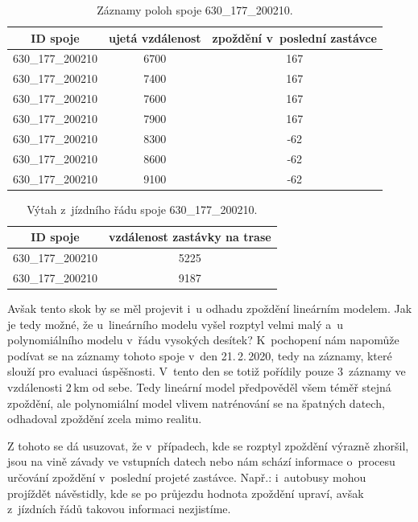 \begin{center}
   \begin{table}[ht]
\centering
\begin{tabular}{|c|c|c|}
\hline
ID spoje & ujetá vzdálenost & zpoždění v~poslední zastávce \\ \hline \hline
630\_177\_200210 & 6700 & 167 \\ \hline
630\_177\_200210 & 7400 & 167 \\ \hline
630\_177\_200210 & 7600 & 167 \\ \hline
630\_177\_200210 & 7900 & 167 \\ \hline
630\_177\_200210 & 8300 & -62 \\ \hline
630\_177\_200210 & 8600 & -62 \\ \hline
630\_177\_200210 & 9100 & -62 \\ \hline
\end{tabular}
\label{table:825_samples}
\caption{Záznamy poloh spoje 630\_177\_200210.}
\end{table}
\end{center}

\begin{center}
   \begin{table}[ht]
\centering
\begin{tabular}{|c|c|}
\hline
ID spoje & vzdálenost zastávky na trase \\ \hline \hline
630\_177\_200210 & 5225 \\ \hline
630\_177\_200210 & 9187 \\ \hline
\end{tabular}
\label{tab:825_ride}
\caption{Výtah z~jízdního řádu spoje 630\_177\_200210.}
\end{table}
\end{center}

Avšak tento skok by se měl projevit i~u odhadu zpoždění lineárním modelem. Jak je tedy možné, že u~lineárního modelu vyšel rozptyl velmi malý a~u polynomiálního modelu v~řádu vysokých desítek? K~pochopení nám napomůže podívat se na záznamy tohoto spoje v~den 21.\,2.\,2020, tedy na záznamy, které slouží pro evaluaci úspěšnosti. V~tento den se totiž pořídily pouze 3~záznamy ve vzdálenosti 2\,km od sebe. Tedy lineární model předpověděl všem téměř stejná zpoždění, ale polynomiální model vlivem natrénování se na špatných datech, odhadoval zpoždění zcela mimo realitu.


\bigbreak

Z tohoto se dá usuzovat, že v~případech, kde se rozptyl zpoždění výrazně zhoršil, jsou na vině závady ve vstupních datech nebo nám schází informace o~procesu určování zpoždění v~poslední projeté zastávce. Např.: i~autobusy mohou projíždět návěstidly, kde se po průjezdu hodnota zpoždění upraví, avšak z~jízdních řádů takovou informaci nezjistíme.


